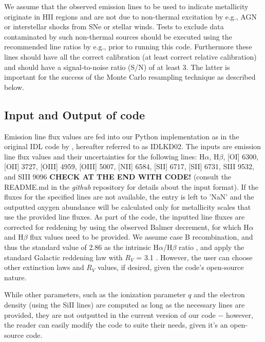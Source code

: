 \documentclass{emulateapj}
\begin{document}
We assume that the observed emission lines to be used to indicate metallicity originate in HII regions and are not due to non-thermal excitation by e.g., AGN or interstellar shocks from SNe or stellar winds.  Tests to exclude data contaminated by such non-thermal sources should be executed using the recommended line ratios by e.g., \citealt{baldwin81,kauffmann03,kewley06_sdss} prior to running this code. Furthermore these lines should have all the correct calibration (at least correct relative calibration) and should have a signal-to-noise ratio (S/N) of at least 3. The latter is important for the success of the Monte Carlo resampling technique as described below.

\subsection{Input and Output of code}
Emission line flux values are fed into our Python implementation as in the original IDL code by \citet{kewley02}, hereafter referred to as IDLKD02. The inputs are emission line flux values and their uncertainties for the following lines: H$\alpha$, H$\beta$, [OI] 6300, [OII] 3727, [OIII] 4959, [OIII] 5007, [NII] 6584, [SII] 6717, [SII] 6731, SIII 9532, and SIII 9096 \textbf{CHECK AT THE END WITH CODE!} (consult the README.md in the \emph{github} repository for details about the input format). If the fluxes for the specified lines are not available, the entry is left to 'NaN' and the outputted oxygen abundance will be calculated only for metallicity scales that use the provided line fluxes. As part of the code, the inputted line fluxes are corrected for reddening by using the observed Balmer decrement, for which H$\alpha$ and  H$\beta$ flux values need to be provided. We assume case B recombination, and thus the standard value of 2.86 as the
intrinsic H$\alpha$/H$\beta$ ratio \citep{osterbrock89}, and apply the standard Galactic reddening law with $R_V$ = 3.1 \citep{cardelli89}. However, the user can choose other extinction laws and $R_V$ values, if desired, given the code's open-source nature.

While other parameters, such as the ionization parameter $q$ and the electron density (using the SiII lines) are computed as long as the necessary lines are provided, they are not outputted in the current version of our code $-$ however, the reader can easily modify the code to suite their needs, given it's an open-source code.
\end{document}
